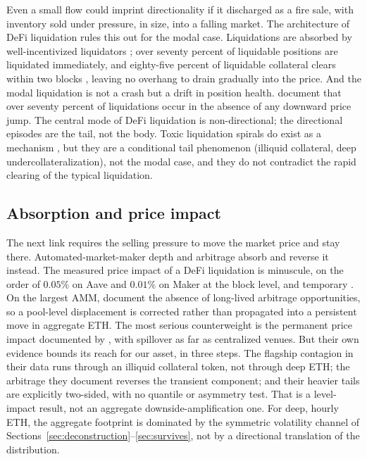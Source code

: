 Even a small flow could imprint directionality if it discharged as a fire
sale, with inventory sold under pressure, in size, into a falling market. The
architecture of DeFi liquidation rules this out for the modal case.
Liquidations are absorbed by well-incentivized liquidators
\citep{qin2021}; over seventy percent of liquidable positions are
liquidated immediately, and eighty-five percent of liquidable collateral
clears within two blocks \citep{perez2021}, leaving no overhang to drain
gradually into the price. And the modal liquidation is not a crash but a
drift in position health. \citet{moallemi2024} document that over
seventy percent of liquidations occur in the absence of any downward price
jump. The central mode of DeFi liquidation is non-directional; the
directional episodes are the tail, not the body. Toxic liquidation spirals
do exist as a mechanism \citep{warmuz2022},
but they are a conditional tail phenomenon (illiquid collateral, deep
undercollateralization), not the modal case, and they do not contradict
the rapid clearing of the typical liquidation.

\subsection{Absorption and price impact}
\label{sec:absorption}

The next link requires the selling pressure to move the market price and
stay there. Automated-market-maker depth and arbitrage absorb and reverse
it instead. The measured price impact of a DeFi liquidation is minuscule, on the order of $0.05\%$ on Aave and $0.01\%$ on Maker at the block level, and temporary
\citep{tian2025}. On the largest AMM, \citet{leharparlour2025} document the absence of long-lived arbitrage opportunities, so a pool-level displacement is corrected rather than propagated into a persistent move in aggregate ETH. The most serious counterweight is the
permanent price impact documented by \citet{lehar2022}, with spillover as
far as centralized venues. But their own evidence bounds its reach for our
asset, in three steps. The flagship contagion in their data runs through
an illiquid collateral token, not through deep ETH; the arbitrage they
document reverses the transient component; and their heavier tails are
explicitly two-sided, with no quantile or asymmetry test. That is a
level-impact result, not an aggregate downside-amplification one. For deep,
hourly ETH, the aggregate footprint is dominated by the symmetric volatility
channel of Sections~\ref{sec:deconstruction}--\ref{sec:survives}, not by a
directional translation of the distribution.

